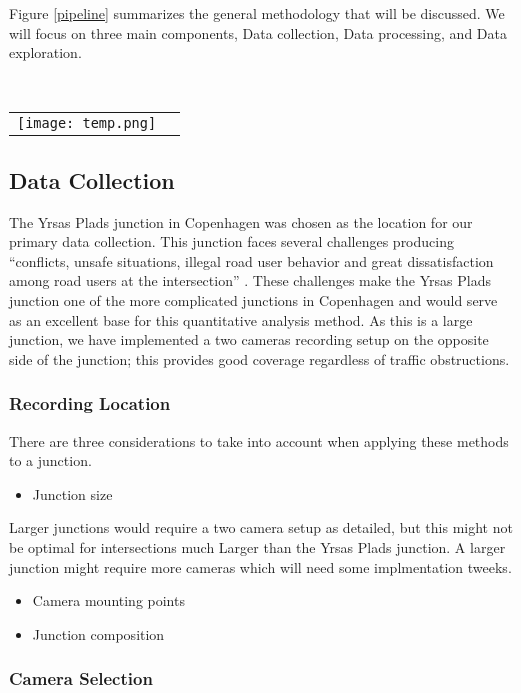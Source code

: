 
Figure \ref{pipeline} summarizes the general methodology that will be discussed. We will focus
on three main components, Data collection, Data processing, and Data exploration.

\ \\ 
\noindent
\begin{tabular}{@{}cc}
\texttt{[image: temp.png]} 
\end{tabular}
\label{pipeline}

\subsection{Data Collection}

The Yrsas Plads junction in Copenhagen was chosen as the location for our primary data collection. 
This junction faces several challenges producing “conflicts, unsafe situations, illegal road user behavior and great dissatisfaction among road users at the intersection” \cite{CPHpost_2021}.
These challenges make the Yrsas Plads junction one of the more complicated junctions in Copenhagen and would serve as an excellent base for this quantitative analysis method. 
As this is a large junction, we have implemented a two cameras recording setup on the opposite side of the junction; this provides good coverage regardless of traffic obstructions.
\subsubsection{Recording Location}

There are three considerations to take into account when applying these methods to a junction.
\begin{itemize}
	\item Junction size
\end{itemize}
Larger junctions would require a two camera setup as detailed, but this might not be optimal for intersections much Larger
than the Yrsas Plads junction. A larger junction might require more cameras which will need some implmentation tweeks.
\begin{itemize}
	\item Camera mounting points
\end{itemize}
\begin{itemize}
	\item Junction composition
\end{itemize}

\subsubsection{Camera Selection}



